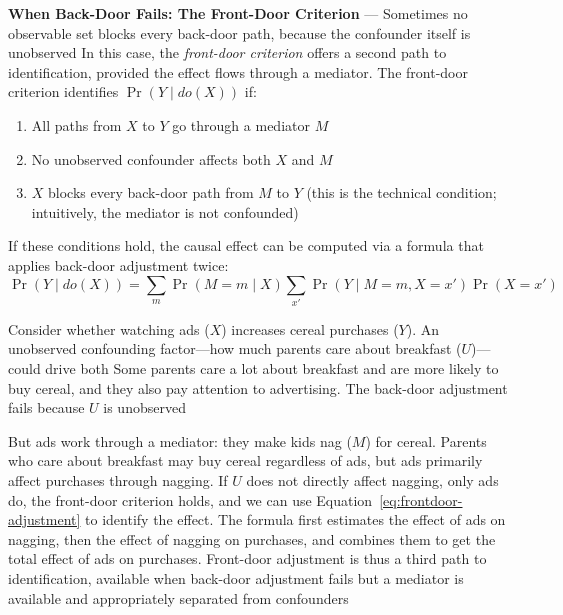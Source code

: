 
\textbf{When Back-Door Fails: The Front-Door Criterion} --- Sometimes no
observable set blocks every back-door path, because the confounder itself is unobserved
In this case, the \emph{front-door criterion} offers a second path to identification,
provided the effect flows through a mediator. The front-door criterion identifies
$\Pr(Y \mid do(X))$ if:

\begin{enumerate}
  \item All paths from $X$ to $Y$ go through a mediator $M$

  \item No unobserved confounder affects both $X$ and $M$

  \item $X$ blocks every back-door path from $M$ to $Y$ (this is the technical
    condition; intuitively, the mediator is not confounded)
\end{enumerate}

If these conditions hold, the causal effect can be computed via a formula that applies
back-door adjustment twice:
\begin{equation}
  \Pr(Y \mid do(X)) = \sum_{m}\Pr(M = m \mid X) \sum_{x'}\Pr(Y \mid M = m, X = x
  ') \Pr(X = x') \label{eq:frontdoor-adjustment}
\end{equation}

Consider whether watching ads ($X$) increases cereal purchases ($Y$). An
unobserved confounding factor—how much parents care about breakfast ($U$)—could drive
both Some parents care a lot about breakfast and are more likely to buy cereal,
and they also pay attention to advertising. The back-door adjustment fails because
$U$ is unobserved

But ads work through a mediator: they make kids nag ($M$) for cereal. Parents
who care about breakfast may buy cereal regardless of ads, but ads primarily affect
purchases through nagging. If $U$ does not directly affect nagging, only ads do,
the front-door criterion holds, and we can use Equation~\eqref{eq:frontdoor-adjustment}
to identify the effect. The formula first estimates the effect of ads on nagging,
then the effect of nagging on purchases, and combines them to get the total effect
of ads on purchases. Front-door adjustment is thus a third path to
identification, available when back-door adjustment fails but a mediator is available
and appropriately separated from confounders

